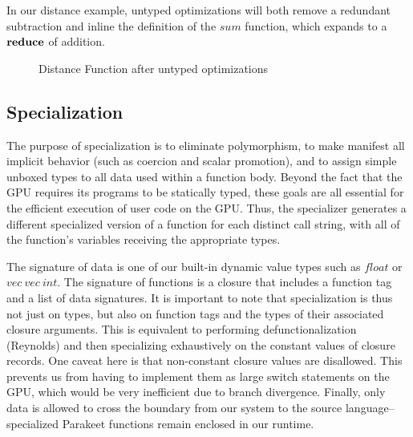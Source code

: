 \documentclass[preprint]{sigplanconf}
\begin{document}
In our distance example, untyped optimizations will both remove a redundant
subtraction and inline the definition of the $sum$ function, which expands to a
$\mbox{\textbf{reduce}}$ of addition.
\begin{figure}[h!]
\caption{Distance Function after untyped optimizations}
\end{figure}

\subsection{Specialization}
The purpose of specialization is to eliminate polymorphism, to make manifest
all implicit behavior (such as coercion and scalar promotion), and to assign
simple unboxed types to all data used within a function body. Beyond the
fact that the GPU requires its programs to be statically typed, these goals are
all essential for the efficient execution of user code on the GPU.
Thus, the specializer generates a different specialized version
of a function for each distinct call string, with all of the function's
variables receiving the appropriate types.  

The signature of data is one of our
built-in dynamic value types such as $float$ or $vec~vec~int$.  The signature of
functions is a closure that includes a function tag and a list of data
signatures.  It is important to note that specialization is thus not just on
types, but also on function tags and the types of their associated closure
arguments. This is equivalent to performing defunctionalization (Reynolds) and
then specializing exhaustively on the constant values of closure records. One
caveat here is that non-constant closure values are disallowed.  This prevents
us from having to implement them as large switch statements on the GPU, which
would be very inefficient due to branch divergence.  Finally, only data is
allowed to cross the boundary from our system to the source
language--specialized Parakeet functions remain enclosed in our runtime.
\end{document}
